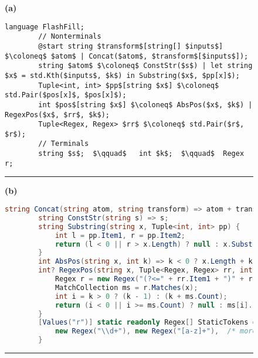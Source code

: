 \begin{figure*}
    \centering
    \lstset{basicstyle = \footnotesize\ttfamily}
    \def\baselinestretch{1.05}
    \begin{subfigure}{1.01\textwidth}
    \hfill\textbf{(a)}\vspace{-0.8\baselineskip}
    \begin{lstlisting}[language=dsl,gobble=8,morekeywords={Regex}]
        language FlashFill;
        // Nonterminals
        @start string $transform$[string[] $inputs$] $\coloneq$ $atom$ | Concat($atom$, $transform$[$inputs$]);
        string $atom$ $\coloneq$ ConstStr($s$) | let string $x$ = std.Kth($inputs$, $k$) in Substring($x$, $pp[x]$);
        Tuple<int, int> $pp$[string $x$] $\coloneq$ std.Pair($pos[x]$, $pos[x]$);
        int $pos$[string $x$] $\coloneq$ AbsPos($x$, $k$) | RegexPos($x$, $rr$, $k$);
        Tuple<Regex, Regex> $rr$ $\coloneq$ std.Pair($r$, $r$);
        // Terminals
        string $s$;  $\qquad$   int $k$;  $\qquad$  Regex r;
    \end{lstlisting}
    \end{subfigure}
    \begin{subfigure}{\textwidth}
    \hrule
    \vspace{5pt}
    \hfill\textbf{(b)}
    \vspace{-0.9\baselineskip}
    \begin{lstlisting}[language=csharp,gobble=8,breaklines=false,morekeywords={Tuple}]
        string Concat(string atom, string transform) => atom + transform;
        string ConstStr(string s) => s;
        string Substring(string x, Tuple<int, int> pp) {
            int l = pp.Item1, r = pp.Item2;
            return (l < 0 || r > x.Length) ? null : x.Substring(l, r - l);
        }
        int AbsPos(string x, int k) => k < 0 ? x.Length + k + 1 : k;
        int? RegexPos(string x, Tuple<Regex, Regex> rr, int k) {
            Regex r = new Regex("(?<=" + rr.Item1 + ")" + rr.Item2);
            MatchCollection ms = r.Matches(x);
            int i = k > 0 ? (k - 1) : (k + ms.Count);
            return (i < 0 || i >= ms.Count) ? null : ms[i].Index;
        }
        [Values("r")] static readonly Regex[] StaticTokens = {
            new Regex("\\d+"), new Regex("[a-z]+"),  /* more tokens... */
        }
    \end{lstlisting}
    \end{subfigure}
    \begin{subfigure}{\textwidth}
    \hrule
    \vspace{5pt}

\end{subfigure}
\end{figure*}
